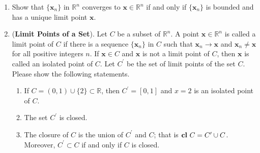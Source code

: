 \documentclass[11pt,letter,notitlepage]{article}
\theoremstyle{definition}
\DeclareMathOperator*{\cl}{\bf cl\,}
\begin{document}
		\begin{exercise}
			\begin{enumerate}
				\item Show that $\{\mathbf{x}_n\}$ in $\mathbb{R}^n$ converges to $\mathbf{x}\in \mathbb{R}^n$ if and only if $\{\mathbf{x}_n\}$ is bounded and has a unique limit point $\mathbf{x}$.
				\item (\textbf{Limit Points of a Set}). Let $C$ be a subset of $\mathbb{R}^n$. A point $\mathbf{x}\in \mathbb{R}^n$ is called a limit point of $C$ if there is a sequence $\{\mathbf{x}_n\}$ in $C$ such that $\mathbf{x}_n\to \mathbf{x}$ and $\mathbf{x}_n \not=\mathbf{x}$ for all positive integers $n$. If $\mathbf{x}\in C$ and $\mathbf{x}$ is not a limit point of $C$, then $\mathbf{x}$ is called an isolated point of $C$. Let $C^\prime$ be the set of limit points of the set $C$. Please show the following statements.
				\begin{enumerate}
					\item If $C = (0,1)\cup\{2\}\subset \mathbb{R}$, then $C^\prime =[0,1]$ and $x=2$ is an isolated point of $C$.
					\item  The set $C^\prime$ is closed.
					\item  The closure of $C$ is the union of $C^\prime$ and $C$; that is $\cl C=C^\prime \cup C$. Moreover, $C^\prime \subset C$ if and only if $C$ is closed.
				\end{enumerate}
			\end{enumerate}
		\end{exercise}
\end{document}
